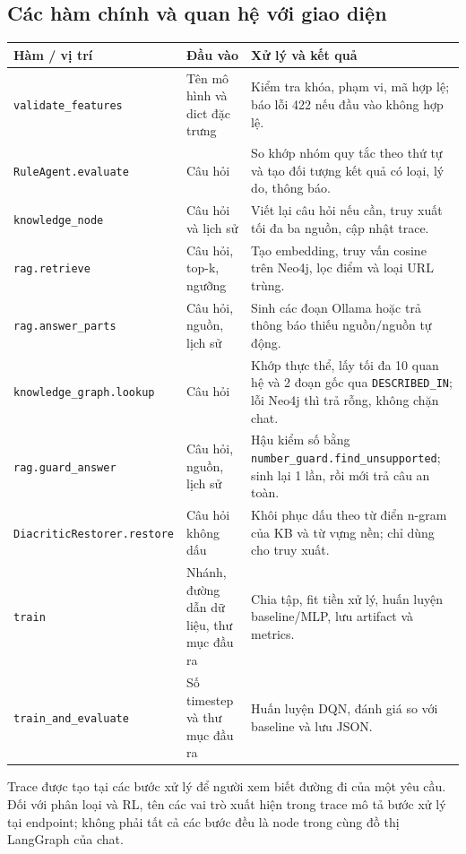 \subsection{Các hàm chính và quan hệ với giao diện}
\begin{longtable}{p{4.7cm}p{4.1cm}p{5.1cm}}\toprule
\textbf{Hàm / vị trí} & \textbf{Đầu vào} & \textbf{Xử lý và kết quả}\\\midrule\endhead
\texttt{validate\_features} & Tên mô hình và dict đặc trưng & Kiểm tra khóa, phạm vi, mã hợp lệ; báo lỗi 422 nếu đầu vào không hợp lệ.\\
\texttt{RuleAgent.evaluate} & Câu hỏi & So khớp nhóm quy tắc theo thứ tự và tạo đối tượng kết quả có loại, lý do, thông báo.\\
\texttt{knowledge\_node} & Câu hỏi và lịch sử & Viết lại câu hỏi nếu cần, truy xuất tối đa ba nguồn, cập nhật trace.\\
\texttt{rag.retrieve} & Câu hỏi, top-k, ngưỡng & Tạo embedding, truy vấn cosine trên Neo4j, lọc điểm và loại URL trùng.\\
\texttt{rag.answer\_parts} & Câu hỏi, nguồn, lịch sử & Sinh các đoạn Ollama hoặc trả thông báo thiếu nguồn/nguồn tự động.\\
\texttt{knowledge\_graph.lookup} & Câu hỏi & Khớp thực thể, lấy tối đa 10 quan hệ và 2 đoạn gốc qua \texttt{DESCRIBED\_IN}; lỗi Neo4j thì trả rỗng, không chặn chat.\\
\texttt{rag.guard\_answer} & Câu hỏi, nguồn, lịch sử & Hậu kiểm số bằng \texttt{number\_guard.find\_unsupported}; sinh lại 1 lần, rồi mới trả câu an toàn.\\
\texttt{DiacriticRestorer.\allowbreak restore} & Câu hỏi không dấu & Khôi phục dấu theo từ điển n-gram của KB và từ vựng nền; chỉ dùng cho truy xuất.\\
\texttt{train} & Nhánh, đường dẫn dữ liệu, thư mục đầu ra & Chia tập, fit tiền xử lý, huấn luyện baseline/MLP, lưu artifact và metrics.\\
\texttt{train\_and\_evaluate} & Số timestep và thư mục đầu ra & Huấn luyện DQN, đánh giá so với baseline và lưu JSON.\\\bottomrule\end{longtable}
\noindent Trace được tạo tại các bước xử lý để người xem biết đường đi của một yêu cầu. Đối với phân loại và RL, tên các vai trò xuất hiện trong trace mô tả bước xử lý tại endpoint; không phải tất cả các bước đều là node trong cùng đồ thị LangGraph của chat.
